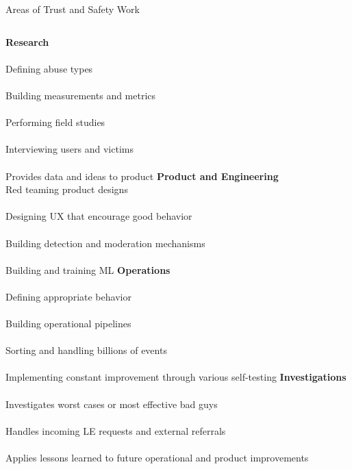 \documentclass[nobackground,dvipsnames,table]{beamer}
\begin{document}
\begin{frame}{Areas of Trust and Safety Work}
    \small
    \begin{columns}[T]
            \textbf{Research}\\~\\
            \scriptsize
            Defining abuse types\\~\\
            Building measurements and metrics\\~\\
            Performing field studies\\~\\
            Interviewing users and victims\\~\\
            Provides data and ideas to product
            \textbf{Product and Engineering} \\
            \scriptsize
            Red teaming product designs \\~\\
            Designing UX that encourage good behavior \\~\\
            Building detection and moderation mechanisms \\~\\
            Building and training ML
            \textbf{Operations} \\~\\
            \scriptsize
            Defining appropriate behavior \\~\\
            Building operational pipelines \\~\\
            Sorting and handling billions of events \\~\\
            Implementing constant improvement through various self-testing
            \textbf{Investigations} \\~\\
            \scriptsize
            Investigates worst cases or most effective bad guys \\~\\
            Handles incoming LE requests and external referrals \\~\\
            Applies lessons learned to future operational and product improvements
    \end{columns}
\end{frame}
\end{document}
